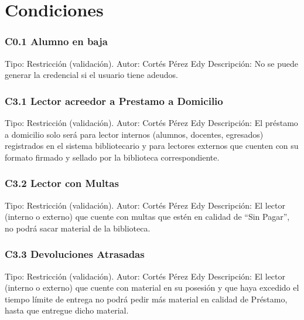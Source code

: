 \chapter{Condiciones}
\label{appendix:Condiciones}

\subsection{C0.1 Alumno en baja }
	\UCli Tipo: Restricción (validación).
	\UCli Autor: Cortés Pérez Edy
	\UCli Descripción: No se puede generar la credencial si el usuario tiene adeudos.
	







\subsection{C3.1 Lector acreedor a Prestamo a Domicilio }
	\UCli Tipo: Restricción (validación).
	\UCli Autor: Cortés Pérez Edy
	\UCli Descripción: El préstamo a domicilio solo será para lector internos (alumnos, docentes, egresados) registrados en el sistema bibliotecario y para lectores externos que cuenten con su formato firmado y sellado por la biblioteca correspondiente.

\subsection{C3.2 Lector con Multas }
	\UCli Tipo: Restricción (validación).
	\UCli Autor: Cortés Pérez Edy
	\UCli Descripción: El lector (interno o externo) que cuente con multas que estén en calidad de “Sin Pagar”, no podrá sacar material de la biblioteca.
	
\subsection{C3.3 Devoluciones Atrasadas }
	\UCli Tipo: Restricción (validación).
	\UCli Autor: Cortés Pérez Edy
	\UCli Descripción: El lector (interno o externo) que cuente con material en su posesión y que haya excedido el tiempo límite de entrega no podrá pedir más material en calidad de Préstamo, hasta que entregue dicho material.
	
